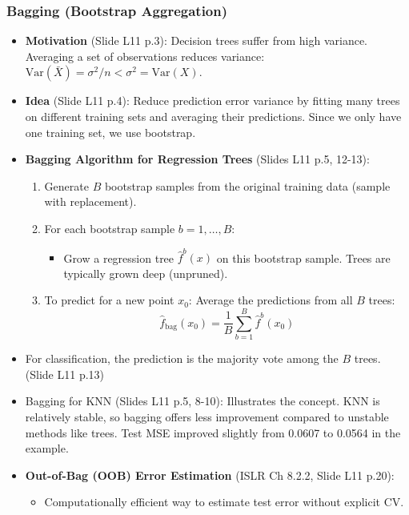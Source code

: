 \documentclass[12pt,a4paper]{article}
\begin{document}
\begin{itemize}
    \subsubsection{Bagging (Bootstrap Aggregation) }
        \begin{itemize}
            \item \textbf{Motivation} (Slide L11 p.3): Decision trees suffer from high variance. Averaging a set of observations reduces variance: $\text{Var}(\bar{X}) = \sigma^2/n < \sigma^2 = \text{Var}(X)$.
            \item \textbf{Idea} (Slide L11 p.4): Reduce prediction error variance by fitting many trees on different training sets and averaging their predictions. Since we only have one training set, we use bootstrap.
            \item \textbf{Bagging Algorithm for Regression Trees} (Slides L11 p.5, 12-13):
                \begin{enumerate}
                    \item Generate $B$ bootstrap samples from the original training data (sample with replacement).
                    \item For each bootstrap sample $b=1, \dots, B$:
                        \begin{itemize}
                            \item Grow a regression tree $\hat{f}^{b}(x)$ on this bootstrap sample. Trees are typically grown deep (unpruned).
                        \end{itemize}
                    \item To predict for a new point $x_0$: Average the predictions from all $B$ trees:
                        $$ \hat{f}_{\text{bag}}(x_0) = \frac{1}{B} \sum_{b=1}^{B} \hat{f}^{b}(x_0) $$
                \end{enumerate}
            \item For classification, the prediction is the majority vote among the $B$ trees. (Slide L11 p.13)
            \item Bagging for KNN (Slides L11 p.5, 8-10): Illustrates the concept. KNN is relatively stable, so bagging offers less improvement compared to unstable methods like trees. Test MSE improved slightly from 0.0607 to 0.0564 in the example.
            \item \textbf{Out-of-Bag (OOB) Error Estimation} (ISLR Ch 8.2.2, Slide L11 p.20):
                \begin{itemize}
                    \item Computationally efficient way to estimate test error without explicit CV.

\end{itemize}
\end{itemize}
\end{itemize}
\end{document}

